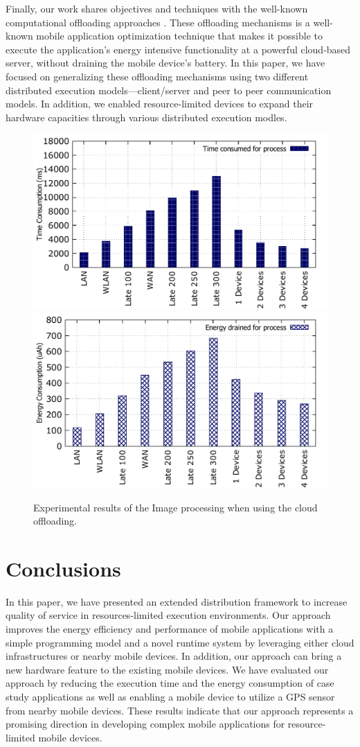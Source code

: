\documentclass{sig-alternate}
\begin{document}
Finally, our work shares objectives and techniques with the well-known computational offloading approaches \cite{maui,comet,mobile-cloud-middleware,fuzzy-engine,sokol+:thinkair}. These offloading mechanisms is a well-known mobile application optimization technique that makes it possible to execute the application's energy intensive functionality at a powerful cloud-based server, without draining the mobile device's battery. In this paper, we have focused on generalizing these offloading mechanisms using two different distributed execution models---client/server and peer to peer communication models. In addition, we enabled resource-limited devices to expand their hardware capacities through various distributed execution modles.


\begin{figure}
\centering
		\includegraphics[width=.42\textwidth]{data/off_compare_img_perf.pdf}
		\includegraphics[width=.42\textwidth]{data/off_compare_img_energy.pdf}
	\caption{Experimental results of the Image processing when using the cloud offloading.}
	\label{fig:off_compare_img}
\end{figure}


\section{Conclusions}
\label{sec:conc}
%
In this paper, we have presented an extended distribution framework to increase quality of service in resources-limited execution environments. Our approach improves the energy efficiency and performance of mobile applications with a simple programming model and a novel runtime system by leveraging either cloud infrastructures or nearby mobile devices. In addition, our approach can bring a new hardware feature to the existing mobile devices. We have evaluated our approach by reducing the execution time and the energy consumption of case study applications as well as enabling a mobile device to utilize a GPS sensor from nearby mobile devices. These results indicate that our approach represents a promising direction in developing complex mobile applications for resource-limited mobile devices.


\balance


\end{document}
